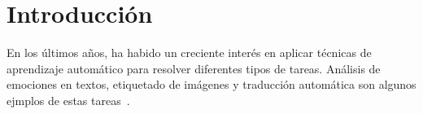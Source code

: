\chapter*{Introducción}\label{chapter:introduction}



En los últimos años, ha habido un creciente interés en aplicar técnicas de aprendizaje automático para resolver diferentes tipos de tareas.
Análisis de emociones en textos, etiquetado de imágenes y traducción automática son algunos ejmplos de estas tareas~\parencite{}.






